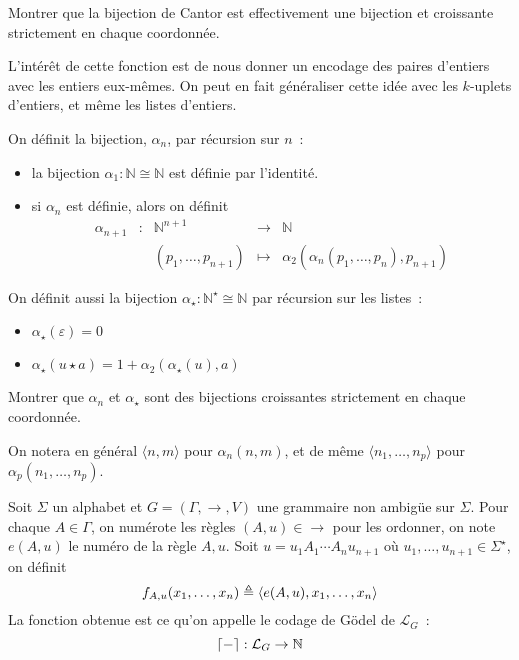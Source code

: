 \begin{exercise}
  Montrer que la bijection de Cantor est effectivement une bijection et
  croissante strictement en chaque coordonnée.
\end{exercise}

L'intérêt de cette fonction est de nous donner un encodage des paires d'entiers
avec les entiers eux-mêmes. On peut en fait généraliser cette idée avec les
$k$-uplets d'entiers, et même les listes d'entiers.

\begin{definition}
  On définit la  bijection, $\alpha_n$, par
  récursion sur $n$~:
  \begin{itemize}
  \item la bijection $\alpha_1 : \mathbb N \cong \mathbb N$ est définie par
    l'identité.
  \item si $\alpha_n$ est définie, alors on définit
    \[\begin{array}{ccccc}
    \alpha_{n+1} & : & \mathbb N^{n+1} & \longrightarrow & \mathbb N\\
    & & (p_1,\ldots,p_{n+1}) & \longmapsto &
    \alpha_2(\alpha_n(p_1,\ldots,p_n),p_{n+1})
    \end{array}\]
  \end{itemize}

  On définit aussi la bijection $\alpha_\star : \mathbb N^\star \cong \mathbb N$
  par récursion sur les listes~:
  \begin{itemize}
  \item $\alpha_\star (\varepsilon) = 0$
  \item $\alpha_\star (u\star a) = 1 + \alpha_2(\alpha_\star(u),a)$
  \end{itemize}
\end{definition}

\begin{exercise}
  Montrer que $\alpha_n$ et $\alpha_\star$ sont des bijections croissantes
  strictement en chaque coordonnée.
\end{exercise}

\begin{notation}
  On notera en général $\langle n,m\rangle$ pour $\alpha_n(n,m)$, et de même
  $\langle n_1,\ldots,n_p\rangle$ pour $\alpha_p(n_1,\ldots,n_p)$.
\end{notation}

\begin{definition}
  Soit $\Sigma$ un alphabet et $G=(\Gamma,\to,V)$ une grammaire non ambigüe sur
  $\Sigma$. Pour chaque $A \in \Gamma$, on numérote les règles $(A,u) \in \to$
  pour les ordonner, on note $e(A,u)$ le numéro de la règle $A,u$. Soit
  $u = u_1A_1\cdots A_nu_{n+1}$ où $u_1,\ldots,u_{n+1}\in\Sigma^\star$, on définit
  \[f_{A,u}(x_1,\ldots,x_n)\triangleq \langle e(A,u),x_1,\ldots,x_n\rangle\]
  La fonction obtenue est ce qu'on appelle le codage de Gödel de
  $\mathcal L_G$~:
  \[\lceil-\rceil : \mathcal L_G \to \mathbb N\]
\end{definition}

